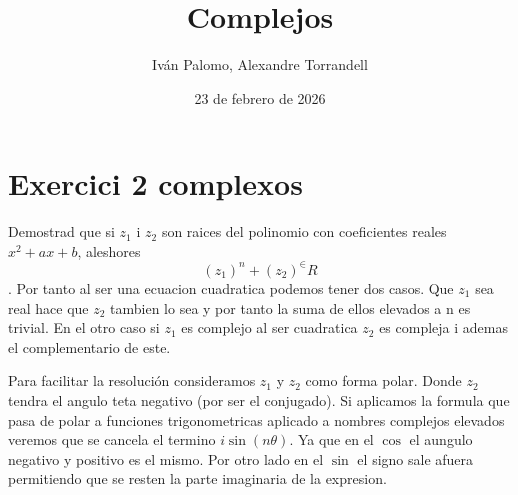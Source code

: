 \documentclass{article}
\title{Complejos}
\author{Iván Palomo, Alexandre Torrandell}
\date{23 de febrero de 2026}
\begin{document}
	\maketitle
	\section{Exercici 2 complexos}
		
Demostrad que si $z_1$ i $z_2$ son raices del polinomio con coeficientes reales $x^2+ax+b$, aleshores $$(z_1)^n+(z_2)^\in R$$.
Por tanto al ser una ecuacion cuadratica podemos tener dos casos. Que $z_1$ sea real hace que $z_2$ tambien lo sea y por tanto la suma de ellos elevados a n es trivial. En el otro caso si $z_1$ es complejo al ser cuadratica $z_2$ es compleja i ademas el complementario de este. 
	
Para facilitar la resolución consideramos $z_1$ y $z_2$ como forma polar. Donde $z_2$ tendra el angulo teta negativo (por ser el conjugado). Si aplicamos la formula que pasa de polar a funciones trigonometricas aplicado a nombres complejos elevados veremos que se cancela el termino $i\sin(n\theta)$. Ya que en el $\cos$ el aungulo negativo y positivo es el mismo. Por otro lado en el $\sin$ el signo sale afuera permitiendo que se resten la parte imaginaria de la expresion.
\end{document}
